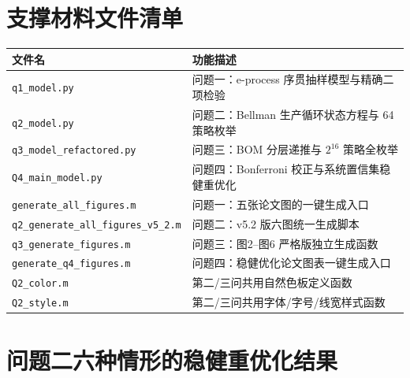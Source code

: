 \documentclass[withoutpreface,bwprint]{cumcmthesis}
\numberwithin{equation}{section}
\begin{document}
\newpage
\begin{appendices}
	
	
	
	
\section{支撑材料文件清单}

\begin{table}[H]
\centering
\renewcommand{\arraystretch}{1.25}
\begin{tabularx}{\textwidth}{L L}
\toprule
\textbf{文件名} & \textbf{功能描述} \\
\midrule
\texttt{q1\_model.py} & 问题一：e-process 序贯抽样模型与精确二项检验 \\
\texttt{q2\_model.py} & 问题二：Bellman 生产循环状态方程与 64 策略枚举 \\
\texttt{q3\_model\_refactored.py} & 问题三：BOM 分层递推与 $2^{16}$ 策略全枚举 \\
\texttt{Q4\_main\_model.py} & 问题四：Bonferroni 校正与系统置信集稳健重优化 \\
\midrule
\texttt{generate\_all\_figures.m} & 问题一：五张论文图的一键生成入口 \\
\texttt{q2\_generate\_all\_figures\_v5\_2.m} & 问题二：v5.2 版六图统一生成脚本 \\
\texttt{q3\_generate\_figures.m} & 问题三：图2--图6 严格版独立生成函数 \\
\texttt{generate\_q4\_figures.m} & 问题四：稳健优化论文图表一键生成入口 \\
\midrule
\texttt{Q2\_color.m} & 第二/三问共用自然色板定义函数 \\
\texttt{Q2\_style.m} & 第二/三问共用字体/字号/线宽样式函数 \\
\bottomrule
\end{tabularx}
\label{tab:文件列表}
\end{table}

\newpage
\section{问题二六种情形的稳健重优化结果}


\end{appendices}
\end{document}
